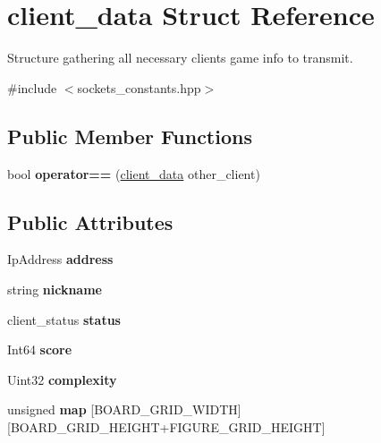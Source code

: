 \hypertarget{structclient__data}{}\section{client\+\_\+data Struct Reference}
\label{structclient__data}


Structure gathering all necessary client\textquotesingle{}s game info to transmit.  




{\ttfamily \#include $<$sockets\+\_\+constants.\+hpp$>$}

\subsection*{Public Member Functions}
\begin{DoxyCompactItemize}
\item 
\mbox{\label{structclient__data_afac3ffdeeac5a171298325af68640770}} 
bool {\bfseries operator==} (\hyperlink{structclient__data}{client\+\_\+data} other\+\_\+client)
\end{DoxyCompactItemize}
\subsection*{Public Attributes}
\begin{DoxyCompactItemize}
\item 
\mbox{\label{structclient__data_a7144da47b526bfa01e1d3bb1d64afc59}} 
Ip\+Address {\bfseries address}
\item 
\mbox{\label{structclient__data_ace607ff30403d26a74c7056ed71705d1}} 
string {\bfseries nickname}
\item 
\mbox{\label{structclient__data_a769885177015f5d9344bab18db658b06}} 
client\+\_\+status {\bfseries status}
\item 
\mbox{\label{structclient__data_a91f992756269079e12dd2b26277c3433}} 
Int64 {\bfseries score}
\item 
\mbox{\label{structclient__data_a7770f1ca21a4b6a51f0d57cbef2f55c3}} 
Uint32 {\bfseries complexity}
\item 
\mbox{\label{structclient__data_a9e8fd25024fa78c3d47fb1e07519789b}} 
unsigned {\bfseries map} \mbox{[}B\+O\+A\+R\+D\+\_\+\+G\+R\+I\+D\+\_\+\+W\+I\+D\+TH\mbox{]}\mbox{[}B\+O\+A\+R\+D\+\_\+\+G\+R\+I\+D\+\_\+\+H\+E\+I\+G\+HT+F\+I\+G\+U\+R\+E\+\_\+\+G\+R\+I\+D\+\_\+\+H\+E\+I\+G\+HT\mbox{]}
\end{DoxyCompactItemize}
